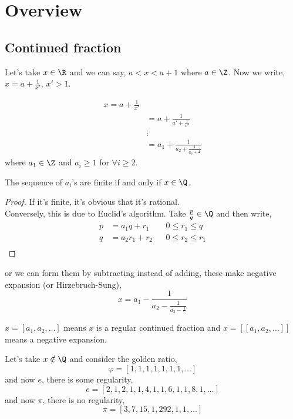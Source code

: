 \documentclass{article}
\begin{document}
  \maketitle

\section{Overview}
\subsection{Continued fraction}
Let's take $x \in \R$ and we can say, $a < x < a + 1$ where $a \in \Z$. Now we write, $x = a + \frac{1}{x'}$, $x' > 1$.

\begin{align*}
  x = a + \frac{1}{x'} \\
  &= a + \frac{1}{a' + \frac{1}{x''}}\\
  &\vdots\\
  &= a_1 + \frac{1}{a_2 + \frac{1}{a_3 + \frac{1}{\ddots}}}
\end{align*}
where $a_1 \in \Z$ and $a_i \ge 1$ for $\forall i \ge 2$. \\

\begin{nlemma}
  The sequence of $a_i$'s are finite if and only if $x \in \Q$.
\end{nlemma}
\begin{proof}
  If it's finite, it's obvious that it's rational.\\
  Conversely, this is due to Euclid's algorithm. Take $\frac{p}{q} \in \Q$ and then write,
  \begin{align*}
    p &= a_1q + r_1 && 0 \le r_1 \le q\\
    q &= a_2r_1 + r_2 && 0 \le r_2 \le r_1\\
  \end{align*}
\end{proof}
or we can form them by subtracting instead of adding, these make negative expansion (or Hirzebruch-Sung),
$$ x = a_1 - \frac{1}{a_2 - \frac{1}{a_3 - \frac{1}{\ddots}}} $$

\begin{notation}
 $x = [a_1, a_2, \dots]$ means $x$ is a regular continued fraction and $x = [[a_1, a_2, \dots]]$ means a negative expansion.
\end{notation}

  Let's take $x \notin \Q$ and consider the golden ratio,\\
  $$ \varphi = [1, 1, 1, 1, 1, 1, 1, \dots] $$
  and now $e$, there is some regularity,
  $$ e = [2, 1, 2, 1, 1, 4, 1, 1, 6, 1, 1, 8, 1, \dots] $$
  and now $\pi$, there is no regularity,
  $$ \pi = [3, 7, 15, 1, 292, 1, 1, \dots] $$
\end{document}
